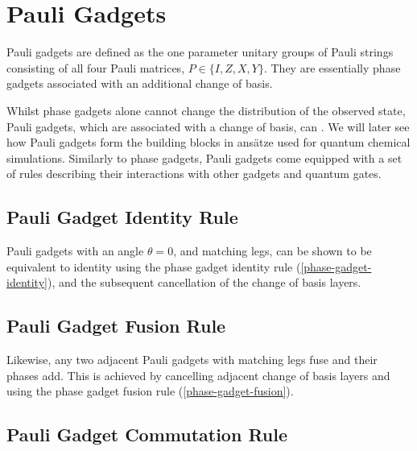 \section{Pauli Gadgets}

Pauli gadgets are defined as the one parameter unitary groups of Pauli strings consisting of all four Pauli matrices, $P \in \{I, Z, X, Y\}$. They are essentially phase gadgets associated with an additional change of basis.


Whilst phase gadgets alone cannot change the distribution of the observed state, Pauli gadgets, which are associated with a change of basis, can \cite{Yeung2020}. We will later see how Pauli gadgets form the building blocks in ansätze used for quantum chemical simulations. Similarly to phase gadgets, Pauli gadgets come equipped with a set of rules describing their interactions with other gadgets and quantum gates.


\subsection{Pauli Gadget Identity Rule}%
\label{pauli-gadget-identity}

Pauli gadgets with an angle $\theta = 0$, and matching legs, can be shown to be equivalent to identity using the phase gadget identity rule (\ref{phase-gadget-identity}), and the subsequent cancellation of the change of basis layers.



\subsection{Pauli Gadget Fusion Rule}%
\label{pauli-gadget-fusion}

Likewise, any two adjacent Pauli gadgets with matching legs fuse and their phases add. This is achieved by cancelling adjacent change of basis layers and using the phase gadget fusion rule (\ref{phase-gadget-fusion}).



\subsection{Pauli Gadget Commutation Rule}%
\label{pauli-gadget-commutation}

